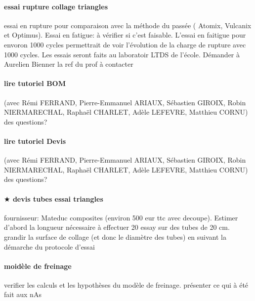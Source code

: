 \paragraph{essai rupture collage triangles} essai en rupture pour comparaison avec la méthode du passée ( Atomix, Vulcanix et Optimus). Essai en fatigue: à vérifier si c'est faisable. L'essai en faitigue pour envoron 1000 cycles permettrait de voir l'évolution de la charge de rupture avec 1000 cycles. Les essais seront faits au laboratoir LTDS de l'école. Démander à Aurelien Bienner la ref du prof à contacter
\paragraph{lire tutoriel BOM} (avec Rémi FERRAND, Pierre-Emmanuel ARIAUX, Sébastien GIROIX, Robin NIERMARECHAL, Raphaël CHARLET, Adèle LEFEVRE, Matthieu CORNU) des questions?
\paragraph{lire tutoriel Devis} (avec Rémi FERRAND, Pierre-Emmanuel ARIAUX, Sébastien GIROIX, Robin NIERMARECHAL, Raphaël CHARLET, Adèle LEFEVRE, Matthieu CORNU) des questions?
\paragraph{$\bigstar$ devis tubes essai triangles} fournisseur: Mateduc composites (environ 500 eur ttc avec decoupe). Estimer d'abord la longueur nécessaire à effectuer 20 essay sur des tubes de 20 cm. grandir la surface de collage (et donc le diamètre des tubes) en suivant la démarche du protocole d'essai
\paragraph{moidèle de freinage} verifier les calculs et les hypothèses du modèle de freinage. présenter ce qui à été fait aux nAs
